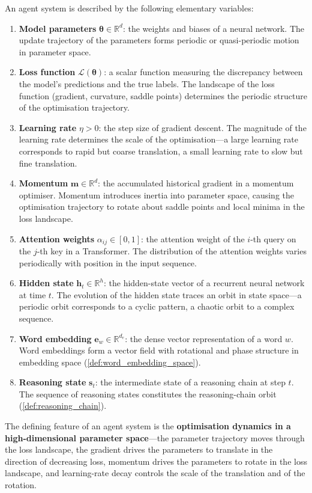 \begin{definition}\label{def:agent_quantities}
An agent system is described by the following elementary variables:
\begin{enumerate}[label=(\roman*)]
    \item \textbf{Model parameters} $\boldsymbol{\theta} \in \mathbb{R}^d$: the weights and biases of a neural network. The update trajectory of the parameters forms periodic or quasi-periodic motion in parameter space.
    \item \textbf{Loss function} $\mathcal{L}(\boldsymbol{\theta})$: a scalar function measuring the discrepancy between the model's predictions and the true labels. The landscape of the loss function (gradient, curvature, saddle points) determines the periodic structure of the optimisation trajectory.
    \item \textbf{Learning rate} $\eta > 0$: the step size of gradient descent. The magnitude of the learning rate determines the scale of the optimisation---a large learning rate corresponds to rapid but coarse translation, a small learning rate to slow but fine translation.
    \item \textbf{Momentum} $\mathbf{m} \in \mathbb{R}^d$: the accumulated historical gradient in a momentum optimiser. Momentum introduces inertia into parameter space, causing the optimisation trajectory to rotate about saddle points and local minima in the loss landscape.
    \item \textbf{Attention weights} $\alpha_{ij} \in [0,1]$: the attention weight of the $i$-th query on the $j$-th key in a Transformer. The distribution of the attention weights varies periodically with position in the input sequence.
    \item \textbf{Hidden state} $\mathbf{h}_t \in \mathbb{R}^h$: the hidden-state vector of a recurrent neural network at time $t$. The evolution of the hidden state traces an orbit in state space---a periodic orbit corresponds to a cyclic pattern, a chaotic orbit to a complex sequence.
    \item \textbf{Word embedding} $\mathbf{e}_w \in \mathbb{R}^{d_e}$: the dense vector representation of a word $w$. Word embeddings form a vector field with rotational and phase structure in embedding space (\cref{def:word_embedding_space}).
    \item \textbf{Reasoning state} $\mathbf{s}_t$: the intermediate state of a reasoning chain at step $t$. The sequence of reasoning states constitutes the reasoning-chain orbit (\cref{def:reasoning_chain}).
\end{enumerate}
The defining feature of an agent system is the \textbf{optimisation dynamics in a high-dimensional parameter space}---the parameter trajectory moves through the loss landscape, the gradient drives the parameters to translate in the direction of decreasing loss, momentum drives the parameters to rotate in the loss landscape, and learning-rate decay controls the scale of the translation and of the rotation.
\end{definition}

